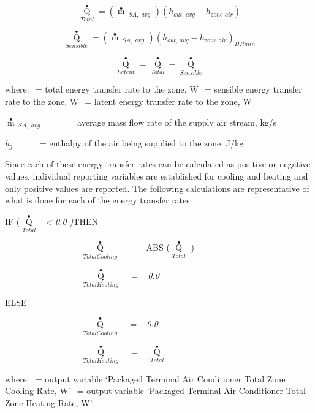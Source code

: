 \begin{equation}
{\mathop Q\limits^ \bullet_{Total}} = \left( {\mathop m\limits^ \bullet  {\,_{SA,\,\,avg}}\,\,} \right)\left( {{h_{out,\,avg}} - {h_{zone\,\,air}}} \right)
\end{equation}

\begin{equation}
{\mathop Q\limits^ \bullet_{Sensible}} = \left( {\mathop m\limits^ \bullet  {\,_{SA,\,\,avg}}\,\,} \right){\left( {{h_{out,\,avg}} - {h_{zone\,\,air}}} \right)_{HRmin}}
\end{equation}

\begin{equation}
{\mathop Q\limits^ \bullet_{Latent}} = {\mathop Q\limits^ \bullet_{Total}} - {\mathop Q\limits^ \bullet_{Sensible}}
\end{equation}

where: \(_{ }\) = total energy transfer rate to the zone, W \(_{ }\) = sensible energy transfer rate to the zone, W \(_{ }\) = latent energy transfer rate to the zone, W

\(\mathop m\limits^ \bullet {\,_{SA,\,\,avg}}\) ~~~~~ = average mass flow rate of the supply air stream, kg/s

\emph{h\(_{g}\)} ~~~~~ = enthalpy of the air being supplied to the zone, J/kg

Since each of these energy transfer rates can be calculated as positive or negative values, individual reporting variables are established for cooling and heating and only positive values are reported. The following calculations are representative of what is done for each of the energy transfer rates:

IF (\({\mathop Q\limits^ \bullet_{Total}}\) \emph{~\textless{} 0.0 )}THEN

~~~~~~~~~~~~~~~~~ \({\mathop Q\limits^ \bullet_{TotalCooling}}\) ~ = ~ ABS (\({\mathop Q\limits^ \bullet_{Total}}\) )

~~~~~~~~~~~~~~~~~ \({\mathop Q\limits^ \bullet_{TotalHeating}}\) \(_{ }\)~ = ~ \emph{0.0}

ELSE

~~~~~~~~~~~~~~~~~ \({\mathop Q\limits^ \bullet_{TotalCooling}}\) \(_{ }\)~ = ~ \emph{0.0}

~~~~~~~~~~~~~~~~~ \({\mathop Q\limits^ \bullet_{TotalHeating}}\) \(_{ }\)~ = ~ \({\mathop Q\limits^ \bullet_{Total}}\)

where: \(_{ }\) = output variable `Packaged Terminal Air Conditioner Total Zone Cooling Rate, W' \(_{ }\) = output variable `Packaged Terminal Air Conditioner Total Zone Heating Rate, W'

